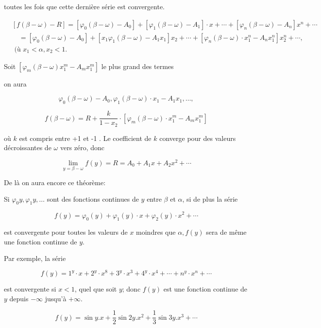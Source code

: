 \documentclass{article}
\begin{document}
toutes les fois que cette dernière série est convergente.

\[
\begin{aligned}
& {[f(\beta-\omega)-R]=\left[\varphi_{0}(\beta-\omega)-A_{0}\right]+\left[\varphi_{1}(\beta-\omega)-A_{1}\right] \cdot x+\cdots+\left[\varphi_{n}(\beta-\omega)-A_{n}\right] x^{n}+\cdots} \\
& \quad=\left[\varphi_{0}(\beta-\omega)-A_{0}\right]+\left[x_{1} \varphi_{1}(\beta-\omega)-A_{1} x_{1}\right] x_{2}+\cdots+\left[\varphi_{n}(\beta-\omega) \cdot x_{1}^{n}-A_{n} x_{1}^{n}\right] x_{2}^{n}+\cdots, \\
& \text { (ù } x_{1}<\alpha, x_{2}<1 .
\end{aligned}
\]

Soit \(\left[\varphi_{m}(\beta-\omega) x_{1}^{m}-A_{m} x_{1}^{m}\right]\) le plus grand des termes

on aura

\[
\varphi_{0}(\beta-\omega)-A_{0}, \varphi_{1}(\beta-\omega) \cdot x_{1}-A_{1} x_{1}, \ldots,
\]

\[
f(\beta-\omega)=R+\frac{k}{1-x_{2}} \cdot\left[\varphi_{m}(\beta-\omega) \cdot x_{1}^{m}-A_{m} x_{1}^{m}\right]
\]

où \(k\) est compris entre +1 et -1 . Le coefficient de \(k\) converge pour des valeurs décroissantes de \(\omega\) vers zéro, donc

\[
\lim _{y=\beta-\omega} f(y)=R=A_{0}+A_{1} x+A_{2} x^{2}+\cdots
\]

De là on aura encore ce théorème:

Si \(\varphi_{0} y, \varphi_{1} y, \ldots\) sont des fonctions continues de \(y\) entre \(\beta\) et \(\alpha\), si de plus la série

\[
f(y)=\varphi_{0}(y)+\varphi_{1}(y) \cdot x+\varphi_{2}(y) \cdot x^{2}+\cdots
\]

est convergente pour toutes les valeurs de \(x\) moindres que \(\alpha, f(y)\) sera de même une fonction continue de \(y\).

Par exemple, la série

\[
f(y)=1^{y} \cdot x+2^{y} \cdot x^{8}+3^{y} \cdot x^{3}+4^{y} \cdot x^{4}+\cdots+n^{y} \cdot x^{n}+\cdots
\]

est convergente si \(x<1\), quel que soit \(y\); donc \(f(y)\) est une fonction continue de \(y\) depuis \(-\infty\) jusqu'à \(+\infty\).

\[
f(y)=\sin y . x+\frac{1}{2} \sin 2 y . x^{2}+\frac{1}{3} \sin 3 y . x^{3}+\cdots
\]
\end{document}
